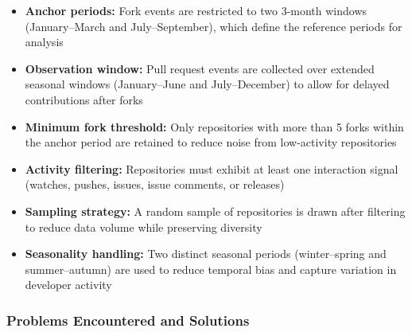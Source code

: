 \begin{itemize}
    \item \textbf{Anchor periods:} Fork events are restricted to two 3-month windows (January–March and July–September), which define the reference periods for analysis
    
    \item \textbf{Observation window:} Pull request events are collected over extended seasonal windows (January–June and July–December) to allow for delayed contributions after forks
    
    \item \textbf{Minimum fork threshold:} Only repositories with more than 5 forks within the anchor period are retained to reduce noise from low-activity repositories
    
    \item \textbf{Activity filtering:} Repositories must exhibit at least one interaction signal (watches, pushes, issues, issue comments, or releases)
    
    \item \textbf{Sampling strategy:} A random sample of repositories is drawn after filtering to reduce data volume while preserving diversity
    
    \item \textbf{Seasonality handling:} Two distinct seasonal periods (winter–spring and summer–autumn) are used to reduce temporal bias and capture variation in developer activity
\end{itemize}

\subsubsection{Problems Encountered and Solutions}

